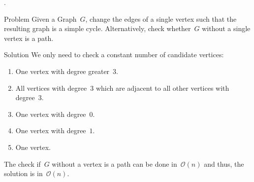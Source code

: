 \begin{frame}{.}
	\begin{block}{Problem}
		Given a Graph~$G$, change the edges of a single vertex such that the resulting graph is a simple cycle.
		\pause
		Alternatively, check whether~$G$ without a single vertex is a path.
	\end{block}
	\pause
	\begin{block}{Solution}
		We only need to check a constant number of candidate vertices:
		\begin{enumerate}
			\item One vertex with degree greater~$3$.
			\item All vertices with degree~$3$ which are adjacent to all other vertices with degree~$3$.
			\item One vertex with degree~$0$.
			\item One vertex with degree~$1$.
			\item One vertex.
		\end{enumerate}
		The check if~$G$ without a vertex is a path can be done in~$\mathcal{O}(n)$ and thus, the solution is in~$\mathcal{O}(n)$.
	\end{block}
\end{frame}
